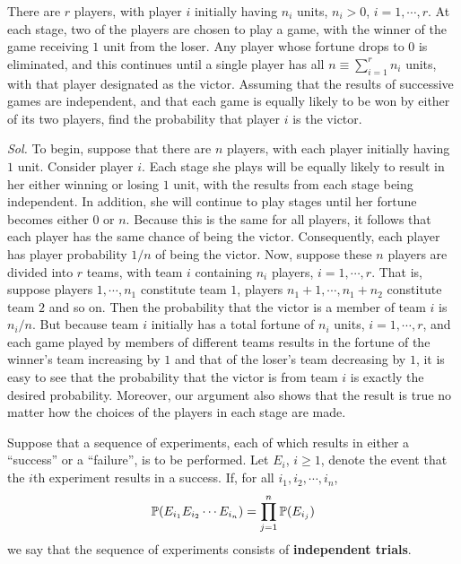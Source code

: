 \begin{example}
    There are $r$ players, with player $i$ initially having $n_i$ units, $n_i > 0$, $i = 1, \cdots , r$. At each stage, two of the players are chosen to play a game, with the winner of the game receiving $1$ unit from the loser. Any player whose fortune drops to $0$ is eliminated, and this continues until a single player has all $n \equiv \sum_{i=1}^r n_i$ units, with that player designated as the victor. Assuming that the results of successive games are independent, and that each game is equally likely to be won by either of its two players, find the probability that player $i$ is the victor.

    \textit{ Sol. } To begin, suppose that there are $n$ players, with each player initially having $1$ unit. Consider player $i$. Each stage she plays will be equally likely to result in her either winning or losing $1$ unit, with the results from each stage being
    independent. In addition, she will continue to play stages until her fortune becomes either $0$ or $n$. Because this is the same for all players, it follows that each player has the same chance of being the victor. Consequently, each player has player probability $1 / n$ of being the victor. Now, suppose these $n$ players are divided into
    $r$ teams, with team $i$ containing $n_i$ players, $i = 1, \cdots , r$. That is, suppose players $1, \cdots, n_1$ constitute team $1$, players $n_1 + 1, \cdots , n_1 + n_2$ constitute team $2$ and so
    on. Then the probability that the victor is a member of team $i$ is $n_i / n$. But because team $i$ initially has a total fortune of $n_i$ units, $i = 1, \cdots, r$, and each game played by members of different teams results in the fortune of the winner’s team increasing by $1$ and that of the loser’s team decreasing by $1$, it is easy to see that the probability that the victor is from team $i$ is exactly the desired probability. Moreover, our argument also shows that the result is true no matter how the choices of the players in each stage are made.
\end{example}

\begin{definition}
    Suppose that a sequence of experiments, each of which results in either a ``success'' or a ``failure'', is to be performed. Let $E_i$, $i \ge 1$, denote the event that the $i$th experiment results in a success. If, for all $i_1, i_2, \cdots, i_n$,
    \begin{equation*}
        \mathbb{P} (E_{i_1}E_{i_2} \cdots E_{i_n}) = \prod_{j=1}^n \mathbb{P}(E_{i_j})
    \end{equation*}
    we say that the sequence of experiments consists of \textbf{independent trials}.
\end{definition}